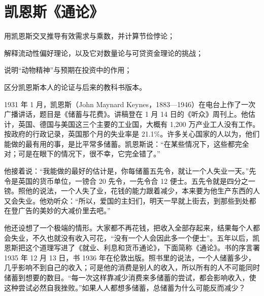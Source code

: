 \chapter{凯恩斯《通论》}\label{ch:generaltheory}

\begin{chapterguide}
\begin{guidegoals}
\item 用凯恩斯交叉推导有效需求与乘数，并计算节俭悖论；
\item 解释流动性偏好理论，以及它对数量论与可贷资金理论的挑战；
\item 说明“动物精神”与预期在投资中的作用；
\item 区分凯恩斯本人的论证与后来的教科书版本。
\end{guidegoals}
\end{chapterguide}

1931 年 1 月，凯恩斯（John Maynard Keynes，1883—1946）在电台上作了一次广播讲话，题目是《储蓄与花费》\cite{keynes1931b,loc32}。讲稿登在 1 月 14 日的《听众》周刊上\cite{keynes1931b}。他估计，英国、德国与美国这三个主要的工业国，大概有 1,200 万产业工人没有工作\cite{keynes1931b}。按政府的行政记录，英国那个月的失业率是 21.1\%\cite{boe2017}。许多关心国家的人以为，他们能做的最有用的事，是比平常多储蓄。凯恩斯说：“在某些情况下，这些都完全对；可是在眼下的情况下，很不幸，它完全错了。”\cite{keynes1931b}

他接着说：“我能做的最好的估计是，你每储蓄五先令，就让一个人失业一天。”\cite{keynes1931b}先令是英国的货币单位，一镑合 20 先令，一先令合 12 便士。五先令就是四分之一镑。照他的说法，一个人失了业，花钱的能力跟着减少，本来要为他生产东西的人又会失业\cite{keynes1931b}。他劝听众：“所以，爱国的主妇们，明天一早就上街去，到那些到处都在登广告的美妙的大减价里去吧。”\cite{keynes1931b}

他还设想了一个极端的情形。大家都不再花钱，把收入全部存起来，结果每个人都会失业，不久也就没有收入可花，“没有一个人会因此多一个便士”\cite{keynes1931b}。五年以后，凯恩斯把这个道理写进了《就业、利息和货币通论》，下面简称《通论》。书的序言署 1935 年 12 月 13 日，书 1936 年在伦敦出版\cite{keynes1936}。照书里的说法，一个人储蓄多少，几乎影响不到自己的收入；可是他的消费是别人的收入，所以所有的人不可能同时储蓄到想要的数目\cite{keynes1936}。“每一次这样靠减少消费来多储蓄的尝试，都会影响收入，使这种尝试必然自我挫败。”\cite{keynes1936}如果人人都想多储蓄，总储蓄为什么可能反而减少？

